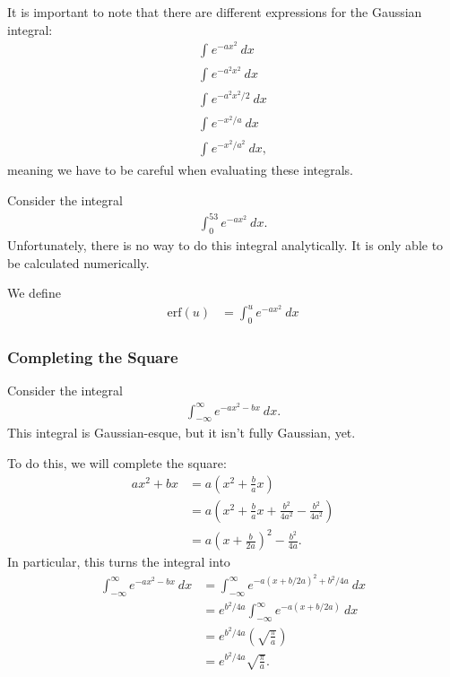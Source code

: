 \documentclass[10pt]{mypackage}
\begin{document}
It is important to note that there are different expressions for the Gaussian integral:
\begin{align*}
  \int_{}^{} e^{-ax^2}\:dx\\
  \int_{}^{} e^{-a^2x^2}\:dx\\
  \int_{}^{} e^{-a^2x^2/2}\:dx\\
  \int_{}^{} e^{-x^2/a}\:dx\\
  \int_{}^{} e^{-x^2/a^2}\:dx,
\end{align*}
meaning we have to be careful when evaluating these integrals.
\begin{example}
Consider the integral
\begin{align*}
  \int_{0}^{53} e^{-ax^2}\:dx.
\end{align*}
Unfortunately, there is no way to do this integral analytically. It is only able to be calculated numerically.\newline

We define
\begin{align*}
  \text{erf}\left(u\right) &= \int_{0}^{u} e^{-ax^2}\:dx
\end{align*}
\end{example}
\subsubsection{Completing the Square}%
\begin{example}
  Consider the integral
  \begin{align*}
    \int_{-\infty}^{\infty} e^{-ax^2-bx}\:dx.
  \end{align*}
  This integral is Gaussian-esque, but it isn't fully Gaussian, yet.\newline

  To do this, we will complete the square:
  \begin{align*}
    ax^2 + bx &= a\left(x^2 + \frac{b}{a}x\right)\\
              &= a\left(x^2 + \frac{b}{a}x + \frac{b^2}{4a^2} - \frac{b^2}{4a^2}\right)\\
              &= a\left(x + \frac{b}{2a}\right)^2 - \frac{b^2}{4a}.
  \end{align*}
  In particular, this turns the integral into
  \begin{align*}
    \int_{-\infty}^{\infty} e^{-ax^2 - bx}\:dx &= \int_{-\infty}^{\infty} e^{-a\left(x + b/2a\right)^2 + b^2/4a}\:dx\\
                                               &= e^{b^2/4a}\int_{-\infty}^{\infty} e^{-a\left(x + b/2a\right)}\:dx\\
                                               &= e^{b^2/4a}\left(\sqrt{\frac{\pi}{a}}\right)\\
                                               &= e^{b^2/4a}\sqrt{\frac{\pi}{a}}.
  \end{align*}
\end{example}
\end{document}
